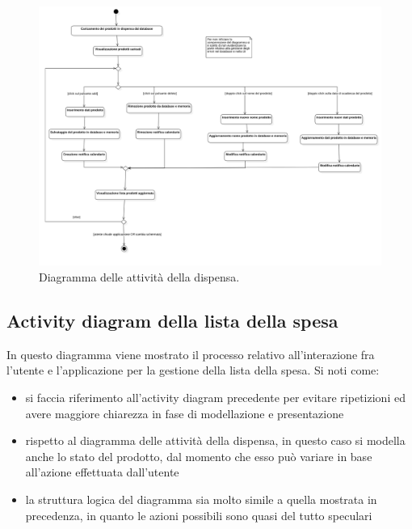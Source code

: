 \begin{figure}[H]
    \includegraphics[width=\linewidth]{images/activity-pantry.png}
    \caption{Diagramma delle attività della dispensa.}
    \label{fig:actpantry}
\end{figure}

\newpage

\subsection{Activity diagram della lista della spesa}

In questo diagramma viene mostrato il processo relativo all'interazione fra l'utente e l'applicazione per la gestione della lista della spesa.
Si noti come:
\begin{itemize}
\item si faccia riferimento all'activity diagram precedente per evitare ripetizioni ed avere maggiore chiarezza in fase di modellazione e presentazione
\item rispetto al diagramma delle attività della dispensa, in questo caso si modella anche lo stato del prodotto, dal momento che esso può variare in base all'azione effettuata dall'utente
\item la struttura logica del diagramma sia molto simile a quella mostrata in precedenza, in quanto le azioni possibili sono quasi del tutto speculari
\end{itemize}

